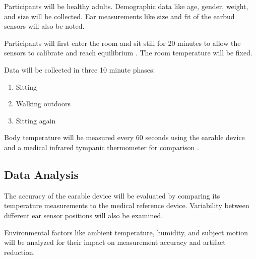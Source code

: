 Participants will be healthy adults. Demographic data like age, gender, weight, and size will be collected. Ear measurements like size and fit of the earbud sensors will also be noted.

Participants will first enter the room and sit still for 20 minutes to allow the sensors to calibrate and reach equilibrium \cite{chagllae.MeasurementCoreBody2018}. The room temperature will be fixed.

Data will be collected in three 10 minute phases:
\begin{enumerate}
\item Sitting
\item Walking outdoors
\item Sitting again
\end{enumerate}

Body temperature will be measured every 60 seconds using the earable device and a medical infrared tympanic thermometer for comparison \cite{chagllae.MeasurementCoreBody2018,boanoNoninvasiveMeasurementCore2013}.

\subsection{Data Analysis}
The accuracy of the earable device will be evaluated by comparing its temperature measurements to the medical reference device. Variability between different ear sensor positions will also be examined.

Environmental factors like ambient temperature, humidity, and subject motion will be analyzed for their impact on measurement accuracy and artifact reduction.